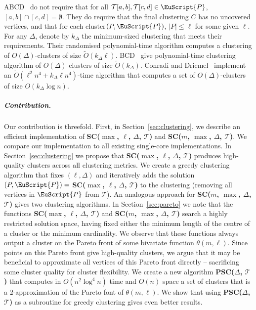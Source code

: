 \documentclass[11pt]{article}
\newcommand{\fancy}[1]{\EuScript{#1}}
\newcommand{\pathlet}{cluster\xspace}
\newcommand{\pathlets}{clusters\xspace}
\begin{document}
%
ABCD~\cite{bruning_subtrajectory_2023} do not require that for all $\mathcal{T}[a, b], \mathcal{T}[c, d] \in {\fancy{P}}$, $[a, b] \cap [c, d] = \emptyset$. They do require that the final clustering $C$ has no uncovered vertices, and that for each \pathlet $(P, {\fancy{P}})$, $|P| \leq \ell$ for some given $\ell$. For any $\Delta$, denote by $k_\Delta$ the minimum-sized clustering that meets their requirements. Their randomised polynomial-time algorithm computes  a clustering of $O(\Delta)$-\pathlets of size $\tilde{O}(k_\Delta \ell)$.
BCD~\cite{bruning2022faster} give polynomial-time clustering algorithm of $O(\Delta)$-\pathlets of size $\tilde{O}(k_\Delta)$.  
Conradi and Driemel~\cite{conradi2023finding} implement an $\tilde{O}(\ell^2 n^4 + k_\Delta \ell n^4)$-time algorithm that computes a set of $O(\Delta)$-\pathlets of size $O(k_\Delta \log n)$. 
%
\subparagraph{Contribution.} Our contribution is threefold.
First, in Section~\ref{sec:clustering}, we describe an efficient implementation of \textbf{SC($\max$, $\ell$, $\Delta$, $\mathcal{T}$)} and \textbf{SC($m$, $\max$, $\Delta$, $\mathcal{T}$)}.
We compare our implementation to all existing single-core implementations. 
%
In Section~\ref{sec:clustering} we propose that \textbf{SC($\max$, $\ell$, $\Delta$, $\mathcal{T}$)} produces high-quality \pathlets across all clustering metrics. 
We create a greedy clustering algorithm that fixes $(\ell, \Delta)$ and iteratively adds the solution $(P, {\fancy{P}}) =$ \textbf{SC($\max$, $\ell$, $\Delta$, $\mathcal{T}$)} to the clustering (removing all vertices in ${\fancy{P}}$ from $\mathcal{T}$). An analogous approach for \textbf{SC($m$, $\max$, $\Delta$, $\mathcal{T}$)} gives two clustering algorithms. 
%
In Section~\ref{sec:pareto} we note that the functions \textbf{SC($\max$, $\ell$, $\Delta$, $\mathcal{T}$)} and \textbf{SC($m$, $\max$, $\Delta$, $\mathcal{T}$)} search a highly restricted solution space, having fixed either the minimum length of the centre of a \pathlet or the minimum cardinality. 
We observe that these functions always output a \pathlet on the Pareto front of some bivariate function $\theta(m, \ell)$. 
Since points on this Pareto front give high-quality \pathlets, we argue that it may be beneficial to approximate all vertices of this Pareto front directly -- sacrificing some \pathlet quality for \pathlet flexibility. 
We create a new algorithm \textbf{PSC($\Delta$, $\mathcal{T}$)} that computes in $O( n^2 \log^4 n)$ time and $O(n)$ space a set of \pathlets that is a $2$-approximation of the Pareto font of $\theta(m, \ell)$. 
We show that using \textbf{PSC($\Delta$, $\mathcal{T}$)}  as a  subroutine for greedy clustering gives even better results. 
\end{document}
